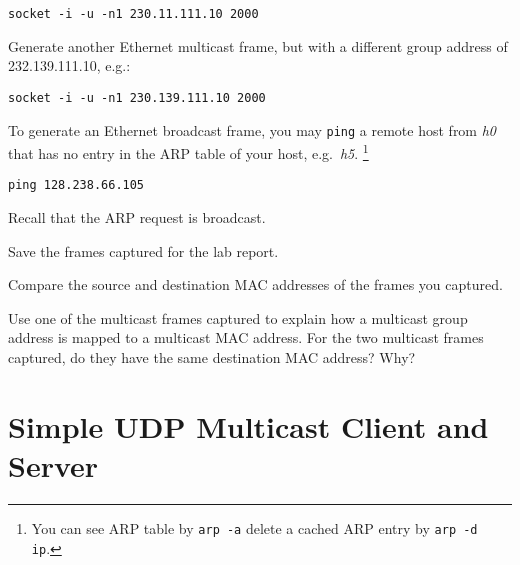 \documentclass{../UTNetLab}
\begin{document}
    \begin{lstlisting}[emph={your-host, remote-host}]
socket -i -u -n1 230.11.111.10 2000
    \end{lstlisting}

    Generate another Ethernet multicast frame, but with a different group address of {232.139.111.10}, e.g.:

    \begin{lstlisting}[emph={your-host, remote-host}]
socket -i -u -n1 230.139.111.10 2000
    \end{lstlisting}


    To generate an Ethernet broadcast frame, you may \lstinline{ping} a remote host from \textit{h0} that has no entry in the ARP table of your host, e.g.\ \textit{h5}.
    \footnote{You can see ARP table by \lstinline{arp -a} delete a cached ARP entry by \lstinline[emph={ip}]{arp -d ip}.}

    \begin{lstlisting}
ping 128.238.66.105
    \end{lstlisting}
    Recall that the ARP request is broadcast.%

    Save the frames captured for the lab report.

    \begin{report}
        \item Compare the source and destination MAC addresses of the frames you captured.

        \item Use one of the multicast frames captured to explain how a multicast group address is mapped to a multicast MAC address.
            For the two multicast frames captured, do they have the same destination MAC address?
            Why?
    \end{report}

\section{Simple UDP Multicast Client and Server}

    
\end{document}
